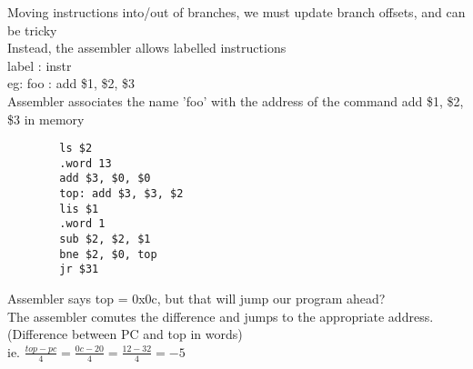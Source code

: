 \documentclass[12pt]{article}
\begin{document}
	Moving instructions into/out of branches, we must update branch offsets, and can be tricky\\
	
	Instead, the assembler allows labelled instructions\\
	label : instr\\
	
	eg: foo : add \$1, \$2, \$3\\
	Assembler associates the name 'foo' with the address of the command add \$1, \$2, \$3 in memory
	
	\lstset{language=[mips]Assembler}
	\begin{lstlisting}
		ls $2
		.word 13
		add $3, $0, $0
		top: add $3, $3, $2
		lis $1
		.word 1
		sub $2, $2, $1
		bne $2, $0, top
		jr $31
	\end{lstlisting}
	
	Assembler says top = 0x0c, but that will jump our program ahead?\\ 
	The assembler comutes the difference and jumps to the appropriate address. (Difference between PC and top in words)\\
	ie. $\frac{top-pc}{4} = \frac{0c - 20}{4} = \frac{12 - 32}{4} = -5$\\
	
\end{document}
